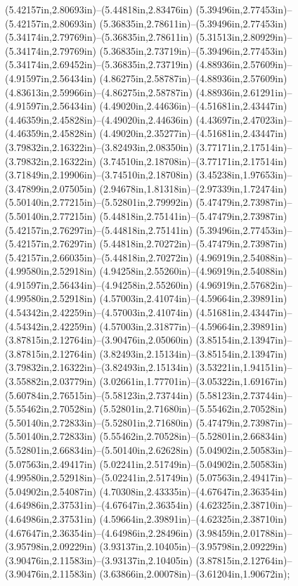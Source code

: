 (5.42157in,2.80693in)--(5.44818in,2.83476in) (5.39496in,2.77453in)--(5.42157in,2.80693in) (5.36835in,2.78611in)--(5.39496in,2.77453in) (5.34174in,2.79769in)--(5.36835in,2.78611in) (5.31513in,2.80929in)--(5.34174in,2.79769in) (5.36835in,2.73719in)--(5.39496in,2.77453in) (5.34174in,2.69452in)--(5.36835in,2.73719in) (4.88936in,2.57609in)--(4.91597in,2.56434in) (4.86275in,2.58787in)--(4.88936in,2.57609in) (4.83613in,2.59966in)--(4.86275in,2.58787in) (4.88936in,2.61291in)--(4.91597in,2.56434in) (4.49020in,2.44636in)--(4.51681in,2.43447in) (4.46359in,2.45828in)--(4.49020in,2.44636in) (4.43697in,2.47023in)--(4.46359in,2.45828in) (4.49020in,2.35277in)--(4.51681in,2.43447in) (3.79832in,2.16322in)--(3.82493in,2.08350in) (3.77171in,2.17514in)--(3.79832in,2.16322in) (3.74510in,2.18708in)--(3.77171in,2.17514in) (3.71849in,2.19906in)--(3.74510in,2.18708in) (3.45238in,1.97653in)--(3.47899in,2.07505in) (2.94678in,1.81318in)--(2.97339in,1.72474in) (5.50140in,2.77215in)--(5.52801in,2.79992in) (5.47479in,2.73987in)--(5.50140in,2.77215in) (5.44818in,2.75141in)--(5.47479in,2.73987in) (5.42157in,2.76297in)--(5.44818in,2.75141in) (5.39496in,2.77453in)--(5.42157in,2.76297in) (5.44818in,2.70272in)--(5.47479in,2.73987in) (5.42157in,2.66035in)--(5.44818in,2.70272in) (4.96919in,2.54088in)--(4.99580in,2.52918in) (4.94258in,2.55260in)--(4.96919in,2.54088in) (4.91597in,2.56434in)--(4.94258in,2.55260in) (4.96919in,2.57682in)--(4.99580in,2.52918in) (4.57003in,2.41074in)--(4.59664in,2.39891in) (4.54342in,2.42259in)--(4.57003in,2.41074in) (4.51681in,2.43447in)--(4.54342in,2.42259in) (4.57003in,2.31877in)--(4.59664in,2.39891in) (3.87815in,2.12764in)--(3.90476in,2.05060in) (3.85154in,2.13947in)--(3.87815in,2.12764in) (3.82493in,2.15134in)--(3.85154in,2.13947in) (3.79832in,2.16322in)--(3.82493in,2.15134in) (3.53221in,1.94151in)--(3.55882in,2.03779in) (3.02661in,1.77701in)--(3.05322in,1.69167in) (5.60784in,2.76515in)--(5.58123in,2.73744in) (5.58123in,2.73744in)--(5.55462in,2.70528in) (5.52801in,2.71680in)--(5.55462in,2.70528in) (5.50140in,2.72833in)--(5.52801in,2.71680in) (5.47479in,2.73987in)--(5.50140in,2.72833in) (5.55462in,2.70528in)--(5.52801in,2.66834in) (5.52801in,2.66834in)--(5.50140in,2.62628in) (5.04902in,2.50583in)--(5.07563in,2.49417in) (5.02241in,2.51749in)--(5.04902in,2.50583in) (4.99580in,2.52918in)--(5.02241in,2.51749in) (5.07563in,2.49417in)--(5.04902in,2.54087in) (4.70308in,2.43335in)--(4.67647in,2.36354in) (4.64986in,2.37531in)--(4.67647in,2.36354in) (4.62325in,2.38710in)--(4.64986in,2.37531in) (4.59664in,2.39891in)--(4.62325in,2.38710in) (4.67647in,2.36354in)--(4.64986in,2.28496in) (3.98459in,2.01788in)--(3.95798in,2.09229in) (3.93137in,2.10405in)--(3.95798in,2.09229in) (3.90476in,2.11583in)--(3.93137in,2.10405in) (3.87815in,2.12764in)--(3.90476in,2.11583in) (3.63866in,2.00078in)--(3.61204in,1.90672in);

